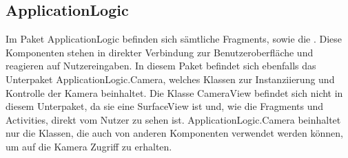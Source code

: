 \label{app:module:applicationlogic}\subsection{ApplicationLogic}
Im Paket ApplicationLogic befinden sich sämtliche Fragments, sowie die . Diese Komponenten stehen in direkter Verbindung zur Benutzeroberfläche und reagieren auf Nutzereingaben. In diesem Paket befindet sich ebenfalls das Unterpaket ApplicationLogic.Camera, welches Klassen zur Instanziierung und Kontrolle der Kamera beinhaltet. Die Klasse CameraView befindet sich nicht in diesem Unterpaket, da sie eine SurfaceView ist und, wie die Fragments und Activities, direkt vom Nutzer zu sehen ist. ApplicationLogic.Camera beinhaltet nur die Klassen, die auch von anderen Komponenten verwendet werden können, um auf die Kamera Zugriff zu erhalten.
